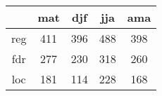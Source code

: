 \begin{tabular}{c|cccc}
& mat & djf & jja & ama \\
\hline
reg & 411 & 396 & 488 & 398 \\
fdr & 277 & 230 & 318 & 260 \\
loc & 181 & 114 & 228 & 168 \\
\end{tabular}
